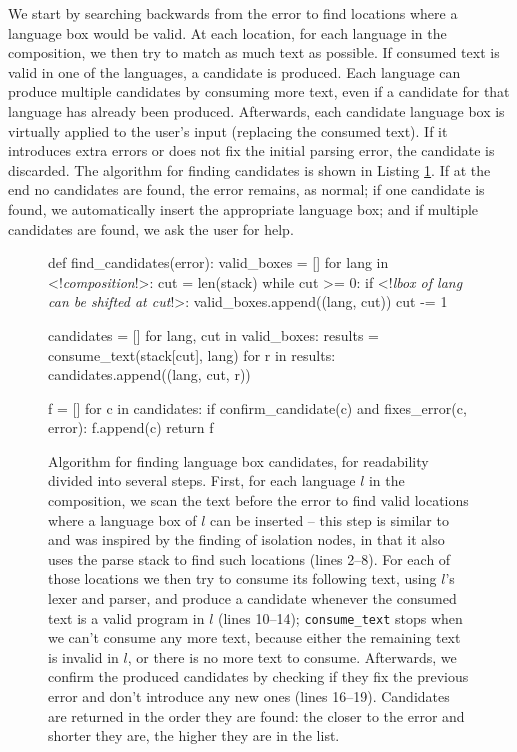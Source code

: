 \documentclass[sigplan,screen]{acmart}\settopmatter{printfolios=true,printccs=false,printacmref=false}
\begin{document}
We start by searching backwards from the error to find locations where a
language box would be valid. At each location, for each language in the composition,
we then try to match as much text as possible. If consumed text is valid in one
of the languages, a candidate is produced. Each language can produce multiple
candidates by consuming more text, even if a candidate for that language has
already been produced. Afterwards, each candidate language box is virtually
applied to the user's input (replacing the consumed text). If it introduces
extra errors or does not fix the initial parsing error, the candidate is
discarded. The algorithm for finding candidates is shown in Listing
\ref{lst_find_candidates}.  If at the end no candidates are found, the error
remains, as normal; if one candidate is found, we automatically insert the
appropriate language box; and if multiple candidates are found, we ask the user
for help.

\begin{figure}[t]
\begin{lstdefault}
def find_candidates(error):
  valid_boxes = []
  for lang in <!\textit{composition}!>:
    cut = len(stack)
    while cut >= 0:
      if <!\textit{lbox of lang can be shifted at cut}!>:
        valid_boxes.append((lang, cut))
      cut -= 1

  candidates = []
  for lang, cut in valid_boxes:
    results = consume_text(stack[cut], lang)
    for r in results:
      candidates.append((lang, cut, r))

  f = []
  for c in candidates:
    if confirm_candidate(c) and fixes_error(c, error):
      f.append(c)
  return f
\end{lstdefault}
\caption{Algorithm for finding language box candidates, for readability divided into
several steps. First, for each language $l$ in the composition, we scan the text
before the error to find valid locations where a language box of $l$ can be
inserted -- this step is similar to and was inspired by the finding of isolation
nodes, in that it also uses the parse stack to find such locations (lines 2--8). For each of
those locations we then try to consume its following text, using $l$'s lexer and
parser, and produce a candidate whenever the consumed text is a valid program in
$l$ (lines 10--14); \texttt{consume\_text} stops when we can't consume any more text, because either the remaining
text is invalid in $l$, or there is no more text to consume. Afterwards, we
confirm the produced candidates by checking if they fix the previous error and
don't introduce any new ones (lines 16--19).
Candidates are returned in the order they are found: the closer to the error and
shorter they are, the higher they are in the list.}
\label{lst_find_candidates}
\end{figure}
\end{document}
